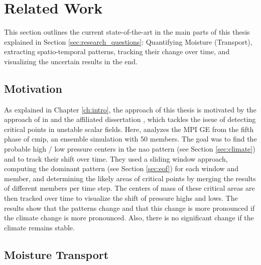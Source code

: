 
\chapter{Related Work}
\label{ch:related_work}

This section outlines the current state-of-the-art in the main parts of this thesis explained in Section \ref{sec:research_questions}: Quantifying Moisture (Transport), extracting spatio-temporal patterns, tracking their change over time, and visualizing the uncertain results in the end.

\section{Motivation}

As explained in Chapter \ref{ch:intro}, the approach of this thesis is motivated by the approach of \citeauthor{vietinghoff_visual_2021} in \cite{vietinghoff_visual_2021} and the affiliated dissertation \cite{vietinghoffdiss}, which tackles the issue of detecting critical points in unstable scalar fields.
Here, \cite{vietinghoff_visual_2021} analyzes the MPI GE \cite{maher_max_2019} from the fifth phase of \ac{cmip}, an ensemble simulation with 50 members. 
The goal was to find the probable high / low pressure centers in the \ac{nao} pattern (see Section \ref{sec:climate}) and to track their shift over time. 
They used a sliding window approach, computing the dominant pattern (see Section \ref{sec:eof})  for each window and member, and determining the likely areas of critical points by merging the results of different members per time step. 
The centers of mass of these critical areas are then tracked over time to visualize the shift of pressure highs and lows. 
The results show that the patterns change and that this change is more pronounced if the climate change is more pronounced. 
Also, there is no significant change if the climate remains stable.


\section{Moisture Transport}
\label{sec:moisture-transport}


